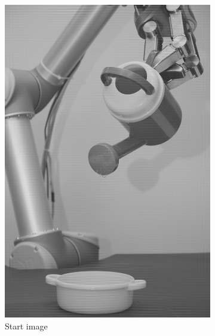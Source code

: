\begin{figure}[H]
\centering
    \begin{subfigure}[b]{0.24\textwidth}
        \includegraphics[width=\textwidth]{img4/Image4_2.png}
        \caption{Start image}
        \label{fig:img4_hist}
    \end{subfigure}
	 \begin{subfigure}[b]{0.24\textwidth}

\end{subfigure}
\end{figure}
